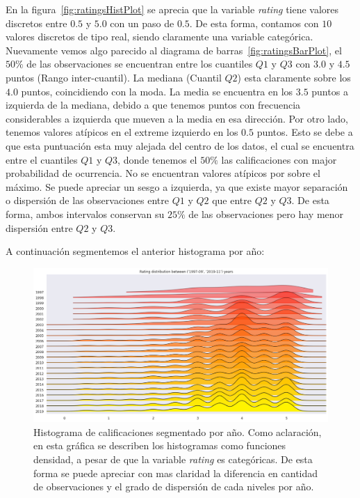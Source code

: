 \documentclass[11pt,a4paper,twoside]{thesis}
\begin{document}
En la figura~\ref{fig:ratingsHistPlot} se aprecia que la variable
\textit{rating} tiene valores discretos entre $0.5$ y $5.0$ con un paso de
$0.5$. De esta forma, contamos con $10$ valores discretos de tipo real, siendo
claramente una variable categórica. Nuevamente vemos algo parecido al diagrama
de barras~\ref{fig:ratingsBarPlot}, el $50\%$ de las observaciones se
encuentran entre los cuantiles $Q1$ y $Q3$ con $3.0$ y $4.5$ puntos (Rango
inter-cuantil). La mediana (Cuantil $Q2$) esta claramente sobre los $4.0$
puntos, coincidiendo con la moda. La media se encuentra en los $3.5$ puntos a
izquierda de la mediana, debido a que tenemos puntos con frecuencia
considerables a izquierda que mueven a la media en esa dirección. Por otro
lado, tenemos valores atípicos en el extreme izquierdo en los $0.5$ puntos.
Esto se debe a que esta puntuación esta muy alejada del centro de los datos, el
cual se encuentra entre el cuantiles $Q1$ y $Q3$, donde tenemos el $50\%$ las
calificaciones con major probabilidad de ocurrencia. No se encuentran valores
atípicos por sobre el máximo. Se puede apreciar un sesgo a izquierda, ya que
existe mayor separación o dispersión de las observaciones entre $Q1$ y $Q2$ que
entre $Q2$ y $Q3$. De esta forma, ambos intervalos conservan su $25\%$ de las
observaciones pero hay menor dispersión entre $Q2$ y $Q3$.

\clearpage
A continuación segmentemos el anterior histograma por año:

\begin{figure}[h!]
	\centering
	\includegraphics[width=15cm]{./images/rating-by-year.png}
	\caption{
		Histograma de calificaciones segmentado por año.
		Como aclaración, en esta gráfica se describen los histogramas
		como funciones densidad, a pesar de que la variable \textit{rating}
		es categóricas. De esta forma se puede apreciar con mas claridad
		la diferencia en cantidad de observaciones y el grado de dispersión de cada
		niveles por año.
	}
	\label{fig:ratingsYearHistPlot}
\end{figure}
\end{document}
